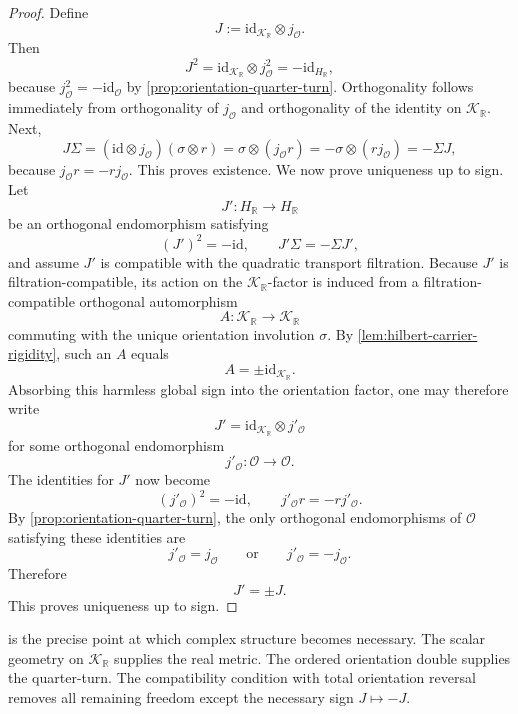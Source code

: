 \begin{proof}
	Define
	\[
		J:=\mathrm{id}_{\mathcal K_{\mathbb R}}\otimes j_{\mathcal O}.
	\]
	Then
	\[
		J^{2}
		=
		\mathrm{id}_{\mathcal K_{\mathbb R}}\otimes j_{\mathcal O}^{2}
		=
		-\mathrm{id}_{H_{\mathbb R}},
	\]
	because \(j_{\mathcal O}^{2}=-\mathrm{id}_{\mathcal O}\) by
	\cref{prop:orientation-quarter-turn}.
	Orthogonality follows immediately from orthogonality of
	\(j_{\mathcal O}\) and orthogonality of the identity on
	\(\mathcal K_{\mathbb R}\).
	Next,
	\[
		J\Sigma
		=
		(\mathrm{id}\otimes j_{\mathcal O})(\sigma\otimes r)
		=
		\sigma\otimes (j_{\mathcal O}r)
		=
		-\sigma\otimes (rj_{\mathcal O})
		=
		-\Sigma J,
	\]
	because \(j_{\mathcal O}r=-rj_{\mathcal O}\).
	This proves existence.
	We now prove uniqueness up to sign.
	Let
	\[
		J':H_{\mathbb R}\to H_{\mathbb R}
	\]
	be an orthogonal endomorphism satisfying
	\[
		(J')^{2}=-\mathrm{id},
		\qquad
		J'\Sigma=-\Sigma J',
	\]
	and assume \(J'\) is compatible with the quadratic transport filtration.
	Because \(J'\) is filtration-compatible, its action on the
	\(\mathcal K_{\mathbb R}\)-factor is induced from a
	filtration-compatible orthogonal automorphism
	\[
		A:\mathcal K_{\mathbb R}\to\mathcal K_{\mathbb R}
	\]
	commuting with the unique orientation involution \(\sigma\).
	By \cref{lem:hilbert-carrier-rigidity}, such an \(A\) equals
	\[
		A=\pm \mathrm{id}_{\mathcal K_{\mathbb R}}.
	\]
	Absorbing this harmless global sign into the orientation factor, one may
	therefore write
	\[
		J'= \mathrm{id}_{\mathcal K_{\mathbb R}}\otimes j'_{\mathcal O}
	\]
	for some orthogonal endomorphism
	\[
		j'_{\mathcal O}:\mathcal O\to\mathcal O.
	\]
	The identities for \(J'\) now become
	\[
		(j'_{\mathcal O})^{2}=-\mathrm{id},
		\qquad
		j'_{\mathcal O}r=-rj'_{\mathcal O}.
	\]
	By \cref{prop:orientation-quarter-turn}, the only orthogonal
	endomorphisms of \(\mathcal O\) satisfying these identities are
	\[
		j'_{\mathcal O}=j_{\mathcal O}
		\qquad\text{or}\qquad
		j'_{\mathcal O}=-j_{\mathcal O}.
	\]
	Therefore
	\[
		J'=\pm J.
	\]
	This proves uniqueness up to sign.
\end{proof}
\begin{remark}
	 is the precise point at which
	complex structure
	becomes necessary.
	The scalar geometry on \(\mathcal K_{\mathbb R}\) supplies the real
	metric.
	The ordered orientation double supplies the quarter-turn.
	The compatibility condition with total orientation reversal removes all
	remaining freedom except the necessary sign \(J\mapsto -J\).
\end{remark}
